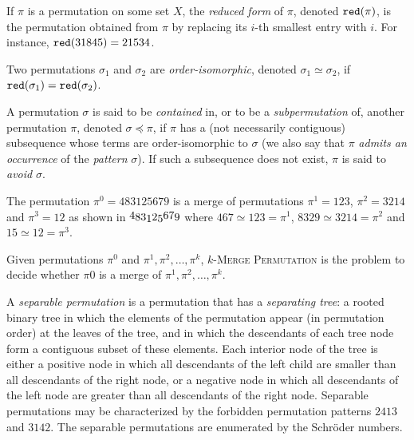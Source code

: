 \begin{definition}
    If $\pi$ is a permutation on some set $X$,
    the \emph{reduced form} of $\pi$, denoted $\operatorname{\texttt{red}}(\pi)$, is the permutation
    obtained from $\pi$ by replacing its $i$-th smallest entry
    with $i$.
    For instance, $\operatorname{\texttt{red}}(31845) = 21534$.
\end{definition}

\begin{definition}
    Two permutations $\sigma_1$ and $\sigma_2$ are \emph{order-isomorphic},
    denoted $\sigma_1 \simeq \sigma_2$,
    if $\operatorname{\texttt{red}}(\sigma_1) = \operatorname{\texttt{red}}(\sigma_2)$.
\end{definition}

\begin{definition}
    A permutation $\sigma$ is said to be \emph{contained} in, or to be
    a \emph{subpermutation} of, another permutation $\pi$, denoted
    $\sigma \preceq \pi$, if $\pi$ has a (not necessarily contiguous)
    subsequence whose terms are order-isomorphic to $\sigma$ (we also
    say that $\pi$ \emph{admits an occurrence} of the \emph{pattern}
    $\sigma$).
    If such a subsequence does not exist, $\pi$ is said to \emph{avoid}
    $\sigma$.
\end{definition}


\begin{example}
The permutation $\pi^0 = 483125679$ is a merge of permutations 
$\pi^1 = 123$, 
$\pi^2 = 3214$ and 
$\pi^3 = 12$
as shown in
$
\raisebox{1.5pt}{$4$}
\raisebox{0pt}{$8$}
\raisebox{0pt}{$3$}
\raisebox{-1.5pt}{$1$}
\raisebox{0pt}{$2$}
\raisebox{-1.5pt}{$5$}
\raisebox{1.5pt}{$6$}
\raisebox{1.5pt}{$7$}
\raisebox{0pt}{$9$}
$
where
$467 \simeq 123 = \pi^1$,
$8329 \simeq 3214 = \pi^2$ and
$15 \simeq 12 = \pi^3$.
\end{example}

Given permutations $\pi^0$ and $\pi^1, \pi^2, \dots, \pi^k$,
\textsc{$k$-Merge Permutation} is the problem to decide whether $\pi0$
is a merge of $\pi^1, \pi^2, \dots, \pi^k$.

A \emph{separable permutation} is a permutation that has a \emph{separating tree}:
a rooted binary tree in which the elements
of the permutation appear (in permutation order) at the leaves of the tree,
and in which the descendants of each tree node form a contiguous subset of
these elements.
Each interior node of the tree is either a positive node in which all
descendants of the left child are smaller than all descendants of the right node,
or a negative node in which all descendants of the left node are greater than all
descendants of the right node.
Separable permutations may be characterized by the forbidden permutation
patterns $2413$ and $3142$.
The separable permutations are enumerated by the Schröder numbers.

